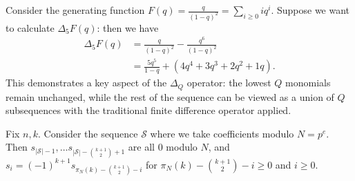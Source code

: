 \documentclass[12pt]{article}
\newcommand{\card}[1]{{\left|{#1}\right|}}
\begin{document}
\begin{example}
Consider the generating function $F(q) = \frac{q}{(1-q)^2} = \sum_{i\ge 0}{iq^i}$. Suppose we want to calculate $\Delta_5 F(q)$: then we have
\begin{align*}
\Delta_5 F(q) &= \frac{q}{(1-q)^2}-\frac{q^6}{(1-q)^2} \\
&= \frac{5q^5}{1-q}+(4q^4+3q^3+2q^2+1q).
\end{align*}
This demonstrates a key aspect of the $\Delta_Q$ operator: the lowest $Q$ monomials  remain unchanged, while the rest of the sequence can be viewed as a union of $Q$ subsequences with the traditional finite difference operator applied.
\end{example}
\begin{theorem}\label{26}
Fix $n,k$. Consider the sequence $\mathcal{S}$ where we take coefficients modulo $N=p^e$. Then $s_{\card{\mathcal{S}}-1}, \ldots s_{\card{\mathcal{S}}-\binom{k+1}{2}+1}$ are all $0$ modulo $N$, and $s_i = (-1)^{k+1} s_{\pi_N(k)-\binom{k+1}{2}-i}$ for $\pi_N(k)-\binom{k+1}{2}-i\ge 0$ and $i\ge 0$.
\end{theorem}
\end{document}
